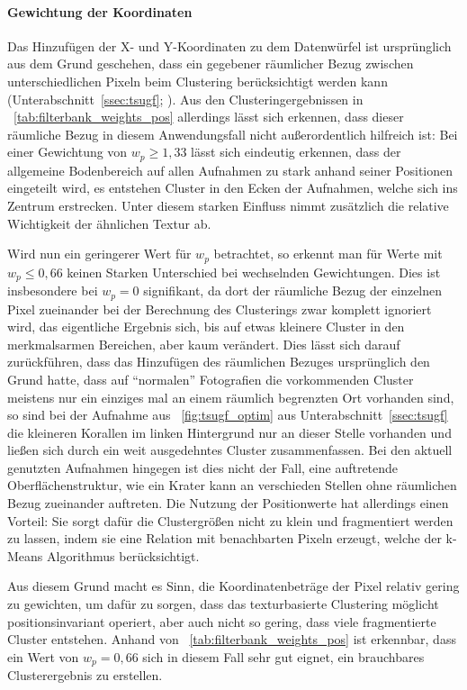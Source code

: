 \paragraph{Gewichtung der Koordinaten}
Das Hinzufügen der X- und Y-Koordinaten zu dem Datenwürfel ist ursprünglich aus dem Grund geschehen, dass ein gegebener räumlicher Bezug zwischen unterschiedlichen Pixeln beim Clustering berücksichtigt werden kann (\vgl Unterabschnitt~\ref{ssec:tsugf}; \cite{jain_91}). Aus den Clusteringergebnissen in \tablename~\ref{tab:filterbank_weights_pos} allerdings lässt sich erkennen, dass dieser räumliche Bezug in diesem Anwendungsfall nicht außerordentlich hilfreich ist: Bei einer Gewichtung von $w_p\geq1,33$ lässt sich eindeutig erkennen, dass der allgemeine Bodenbereich auf allen Aufnahmen zu stark anhand seiner Positionen eingeteilt wird, es entstehen Cluster in den Ecken der Aufnahmen, welche sich ins Zentrum erstrecken. Unter diesem starken Einfluss nimmt zusätzlich die relative Wichtigkeit der ähnlichen Textur ab.

Wird nun ein geringerer Wert für $w_p$ betrachtet, so erkennt man für Werte mit $w_p\leq0,66$ keinen Starken Unterschied bei wechselnden Gewichtungen. Dies ist insbesondere bei $w_p=0$ signifikant, da dort der räumliche Bezug der einzelnen Pixel zueinander bei der Berechnung des Clusterings zwar komplett ignoriert wird, das eigentliche Ergebnis sich, bis auf etwas kleinere Cluster in den merkmalsarmen Bereichen, aber kaum verändert. Dies lässt sich darauf zurückführen, dass das Hinzufügen des räumlichen Bezuges ursprünglich den Grund hatte, dass auf \enquote{normalen} Fotografien die vorkommenden Cluster meistens nur ein einziges mal an einem räumlich begrenzten Ort vorhanden sind, so sind \zB bei der Aufnahme aus \figurename~\ref{fig:tsugf_optim} aus Unterabschnitt~\ref{ssec:tsugf} die kleineren Korallen im linken Hintergrund nur an dieser Stelle vorhanden und ließen sich durch ein weit ausgedehntes Cluster zusammenfassen. Bei den aktuell genutzten Aufnahmen hingegen ist dies nicht der Fall, eine auftretende Oberflächenstruktur, wie \zB ein Krater kann an verschieden Stellen ohne räumlichen Bezug zueinander auftreten.
Die Nutzung der Positionwerte hat allerdings einen Vorteil: Sie sorgt dafür die Clustergrößen nicht zu klein und fragmentiert werden zu lassen, indem sie eine Relation mit benachbarten Pixeln erzeugt, welche der k-Means Algorithmus berücksichtigt.

Aus diesem Grund macht es Sinn, die Koordinatenbeträge der Pixel relativ gering zu gewichten, um dafür zu sorgen, dass das texturbasierte Clustering möglicht positionsinvariant operiert, aber auch nicht so gering, dass viele fragmentierte Cluster entstehen. Anhand von \tablename~\ref{tab:filterbank_weights_pos} ist erkennbar, dass ein Wert von  $w_p=0,66$ sich in diesem Fall sehr gut eignet, ein brauchbares Clusterergebnis zu erstellen.

